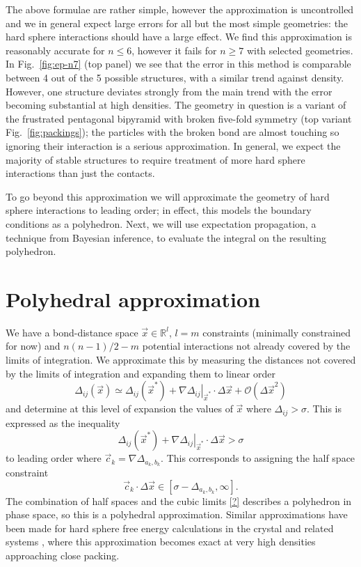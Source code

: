 \documentclass[11pt,twoside]{report}
\begin{document}
The above formulae are rather simple, however the approximation is uncontrolled and we in general expect large errors for all but the most simple geometries: the hard sphere interactions should have a large effect.
We find this approximation is reasonably accurate for $n \le 6$, however it fails for $n \ge 7$ with selected geometries.
In Fig.\ \ref{fig:ep-n7} (top panel) we see that the error in this method is comparable between 4 out of the 5 possible structures, with a similar trend against density.
However, one structure deviates strongly from the main trend with the error becoming substantial at high densities.
The geometry in question is a variant of the frustrated pentagonal bipyramid with broken five-fold symmetry (top variant Fig.\ \ref{fig:packings}); the particles with the broken bond are almost touching so ignoring their interaction is a serious approximation.
In general, we expect the majority of stable structures to require treatment of more hard sphere interactions than just the contacts.

To go beyond this approximation we will approximate the geometry of hard sphere interactions to leading order; in effect, this models the boundary conditions as a polyhedron.
Next, we will use expectation propagation, a technique from Bayesian inference, to evaluate the integral on the resulting polyhedron.

\section{Polyhedral approximation}
\label{sec:polyhedral-approximation}

We have a bond-distance space $\vec{x} \in \mathbb{R}^l$, $l = m$ constraints (minimally constrained for now) and $n(n-1)/2 - m$ potential interactions not already covered by the limits of integration.
We approximate this by measuring the distances not covered by the limits of integration and expanding them to linear order
\begin{equation}
  \Delta_{ij}(\vec{x})
  \simeq
  \Delta_{ij}(\vec{x}^*)
  + \left. \nabla \Delta_{ij} \right|_{\vec{x}^*} \cdot \Delta \vec{x}
  + \mathcal{O}(\Delta \vec{x}^2)
\end{equation}
and determine at this level of expansion the values of $\vec{x}$ where $\Delta_{ij} > \sigma$.
This is expressed as the inequality
\begin{equation}
  \Delta_{ij}(\vec{x}^*)
  + \left. \nabla \Delta_{ij} \right|_{\vec{x}^*} \cdot \Delta \vec{x}
  > \sigma
\end{equation}
to leading order where $\vec{c}_k = \nabla \Delta_{a_k,b_k}$.
This corresponds to assigning the half space constraint
\begin{equation}
  \vec{c}_k \cdot \Delta \vec{x} \in [\sigma - \Delta_{a_k,b_k}, \infty].
\end{equation}
The combination of half spaces and the cubic limits \eqref{?} describes a polyhedron in phase space, so this is a polyhedral approximation.
Similar approximations have been made for hard sphere free energy calculations in the crystal \cite{RadinPRL2005,KochPRE2005} and related systems \cite{LeoniPRL2017}, where this approximation becomes exact at very high densities approaching close packing.
\end{document}
